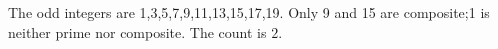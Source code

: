 The odd integers are 1,3,5,7,9,11,13,15,17,19. Only 9 and 15 are composite;1 is neither prime nor composite. The count is $\boxed2$.
